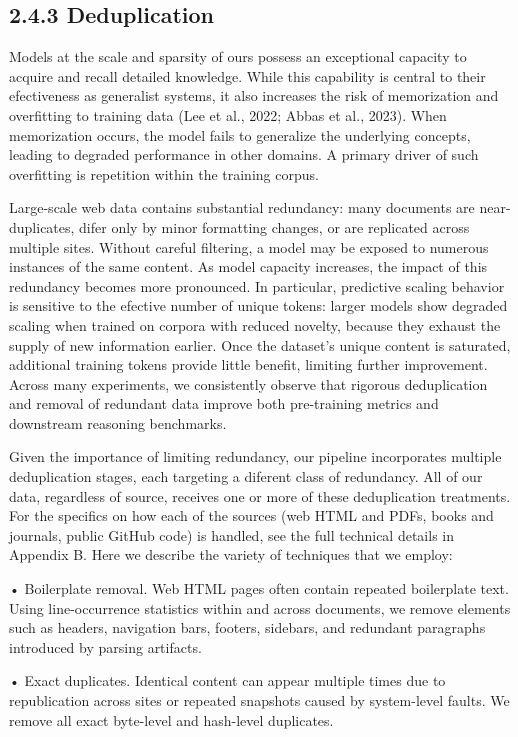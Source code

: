 \documentclass[
  10
]{article}
\begin{document}
\subsection{2.4.3 Deduplication}\label{deduplication}

Models at the scale and sparsity of ours possess an exceptional capacity
to acquire and recall detailed knowledge. While this capability is
central to their efectiveness as generalist systems, it also increases
the risk of memorization and overfitting to training data (Lee et al.,
2022; Abbas et al., 2023). When memorization occurs, the model fails to
generalize the underlying concepts, leading to degraded performance in
other domains. A primary driver of such overfitting is repetition within
the training corpus.

Large-scale web data contains substantial redundancy: many documents are
near-duplicates, difer only by minor formatting changes, or are
replicated across multiple sites. Without careful filtering, a model may
be exposed to numerous instances of the same content. As model capacity
increases, the impact of this redundancy becomes more pronounced. In
particular, predictive scaling behavior is sensitive to the efective
number of unique tokens: larger models show degraded scaling when
trained on corpora with reduced novelty, because they exhaust the supply
of new information earlier. Once the dataset's unique content is
saturated, additional training tokens provide little benefit, limiting
further improvement. Across many experiments, we consistently observe
that rigorous deduplication and removal of redundant data improve both
pre-training metrics and downstream reasoning benchmarks.

Given the importance of limiting redundancy, our pipeline incorporates
multiple deduplication stages, each targeting a diferent class of
redundancy. All of our data, regardless of source, receives one or more
of these deduplication treatments. For the specifics on how each of the
sources (web HTML and PDFs, books and journals, public GitHub code) is
handled, see the full technical details in Appendix B. Here we describe
the variety of techniques that we employ:

• Boilerplate removal. Web HTML pages often contain repeated boilerplate
text. Using line-occurrence statistics within and across documents, we
remove elements such as headers, navigation bars, footers, sidebars, and
redundant paragraphs introduced by parsing artifacts.

• Exact duplicates. Identical content can appear multiple times due to
republication across sites or repeated snapshots caused by system-level
faults. We remove all exact byte-level and hash-level duplicates.
\end{document}
